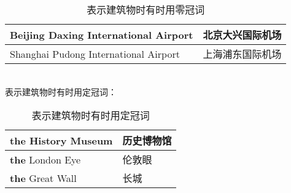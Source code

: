 \documentclass[UTF8]{ctexart}
\begin{document}
    \begin{table}[h!]
        \begin{center}
            \ttfamily
            \begin{tabular}{p{240pt}|p{100pt}}
                \hline
                Beijing Daxing International Airport&北京大兴国际机场\\ \hline
                Shanghai Pudong International Airport&上海浦东国际机场\\ \hline
            \end{tabular}
            \rmfamily
            \caption{表示建筑物时有时用零冠词}
        \end{center}
    \end{table}\\
    表示建筑物时有时用定冠词：
    \begin{table}[h!]
        \begin{center}
            \ttfamily
            \begin{tabular}{p{180pt}|p{100pt}}
                \hline
                \textbf{the} History Museum&历史博物馆\\ \hline
                \textbf{the} London Eye&伦敦眼\\ \hline
                \textbf{the} Great Wall&长城\\ \hline
            \end{tabular}
            \rmfamily
            \caption{表示建筑物时有时用定冠词}
        \end{center}
    \end{table}

\newpage
\end{document}
